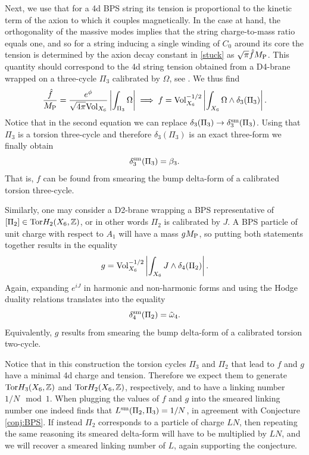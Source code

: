 \documentclass[11pt]{article}
\def\b {\beta}
\def\be{\begin{equation}}
\def\ee{\end{equation}}
\def\om{\omega}
\def\Om{\Omega}
\newcommand{\IZ}{\mathbb{Z}}
\begin{document}
Next, we use that for a 4d BPS  string its tension is proportional to the  kinetic term of the axion to which it couples magnetically. In the  case at hand, the orthogonality of the massive modes implies that the string charge-to-mass ratio equals one, and so for a string inducing a single winding of $C_0$ around its core the tension is determined by the axion decay constant in \eqref{stuck} as ${\sqrt{\pi}} \hat{f}M_{\rm P}$. This quantity should correspond to the 4d string tension obtained from a D4-brane wrapped on a three-cycle $\Pi_3$ calibrated by $\Omega$, see \cite[section 6.4]{Lanza:2021udy}. We thus find
\be
\frac{\hat{f}}{M_{\rm P}}= \frac{e^{\phi}}{{\sqrt{4\pi}} {\rm Vol}_{X_6}} \left| \int_{\Pi_3}  \Om \right| \implies  f = {\rm Vol}_{X_6}^{-1/2} \left| \int_{X_6}  \Om \wedge \delta_3(\Pi_3) \right| .
\label{fst}
\ee
Notice that in the second equation we can replace $\delta_3(\Pi_3) \to \delta_3^{\rm sm}(\Pi_3)$. Using that $\Pi_3$ is a torsion three-cycle and therefore $\delta_3(\Pi_3)$ is an exact three-form we finally obtain
\be
\delta_3^{\rm sm}(\Pi_3) = \b_3 .
\ee
That is, $f$ can be found from smearing the bump delta-form of a calibrated torsion three-cycle. 

Similarly, one may consider a D2-brane wrapping a BPS representative of $[\Pi_2] \in {\rm Tor} H_2 (X_6, \IZ)$, or in other words $\Pi_2$ is calibrated by $J$. A BPS particle of unit charge with respect to $A_1$ will have a mass $g M_{\rm P}$, so putting both statements together results in the equality
\be
g = {\rm Vol}_{X_6}^{-1/2} \left| \int_{X_6}  J \wedge \delta_4(\Pi_2) \right| .
\label{gpt}
\ee
Again, expanding $e^{iJ}$ in harmonic and non-harmonic forms and using the Hodge duality relations translates into the equality 
\be
\delta_4^{\rm sm}(\Pi_2) = \tilde{\om}_4 .
\ee
Equivalently, $g$ results from smearing the bump delta-form of a calibrated torsion two-cycle.

Notice that in this construction the torsion cycles $\Pi_3$ and $\Pi_2$ that lead to $f$ and $g$ have a minimal 4d charge and tension. Therefore we expect them to generate ${\rm Tor} H_3(X_6, \IZ)$ and ${\rm Tor} H_2(X_6, \IZ)$, respectively, and to have a linking number $1/N \mod 1$. When plugging the values of $f$ and $g$ into the smeared linking number one indeed finds that $L^{\rm sm} (\Pi_2, \Pi_3) =1 /N$, in agreement with Conjecture \ref{conj:BPS}. If instead $\Pi_2$ corresponds to a particle of charge $LN$, then repeating the same reasoning its smeared delta-form will have to be multiplied by $LN$, and we will recover a smeared linking number of $L$, again supporting the conjecture. 
\end{document}
